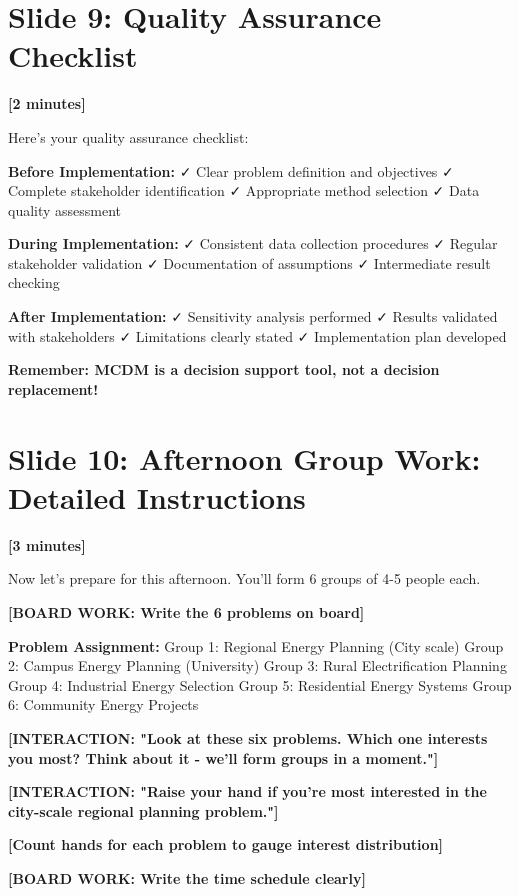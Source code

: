 \documentclass[12pt]{article}
\begin{document}
\section*{Slide 9: Quality Assurance Checklist}
\textcolor{timing}{\textbf{[2 minutes]}}

Here's your quality assurance checklist:

\textcolor{emphasis}{\textbf{Before Implementation:}}
✓ Clear problem definition and objectives
✓ Complete stakeholder identification  
✓ Appropriate method selection
✓ Data quality assessment

\textcolor{emphasis}{\textbf{During Implementation:}}
✓ Consistent data collection procedures
✓ Regular stakeholder validation
✓ Documentation of assumptions
✓ Intermediate result checking

\textcolor{emphasis}{\textbf{After Implementation:}}
✓ Sensitivity analysis performed
✓ Results validated with stakeholders
✓ Limitations clearly stated
✓ Implementation plan developed

\textcolor{emphasis}{\textbf{Remember: MCDM is a decision support tool, not a decision replacement!}}

\section*{Slide 10: Afternoon Group Work: Detailed Instructions}
\textcolor{timing}{\textbf{[3 minutes]}}

Now let's prepare for this afternoon. You'll form 6 groups of 4-5 people each.

\textcolor{speakernote}{\textbf{[BOARD WORK: Write the 6 problems on board]}}

\textcolor{emphasis}{\textbf{Problem Assignment:}}
Group 1: Regional Energy Planning (City scale)
Group 2: Campus Energy Planning (University)
Group 3: Rural Electrification Planning
Group 4: Industrial Energy Selection
Group 5: Residential Energy Systems
Group 6: Community Energy Projects

\textcolor{speakernote}{\textbf{[INTERACTION: "Look at these six problems. Which one interests you most? Think about it - we'll form groups in a moment."]}}

\textcolor{speakernote}{\textbf{[INTERACTION: "Raise your hand if you're most interested in the city-scale regional planning problem."]}}

\textcolor{speakernote}{\textbf{[Count hands for each problem to gauge interest distribution]}}

\textcolor{speakernote}{\textbf{[BOARD WORK: Write the time schedule clearly]}}
\end{document}
